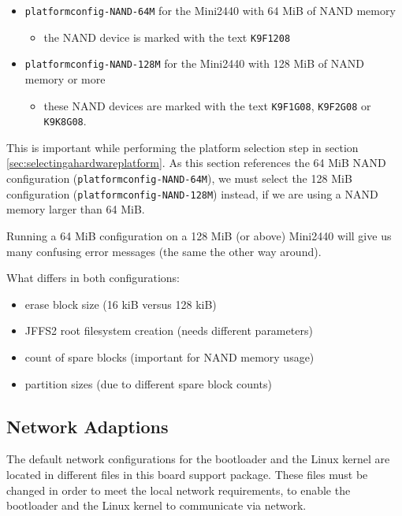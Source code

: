 \begin{itemize}
 \item \texttt{platformconfig-NAND-64M} for the Mini2440 with 64 MiB of NAND
   memory
  \begin{itemize}
   \item the NAND device is marked with the text \texttt{K9F1208}
  \end{itemize}
 \item \texttt{platformconfig-NAND-128M} for the Mini2440 with
  128 MiB of NAND memory or more
  \begin{itemize}
    \item these NAND devices are marked with the text \texttt{K9F1G08},
   \texttt{K9F2G08} or \texttt{K9K8G08}.
  \end{itemize}
\end{itemize}

This is important while performing the platform selection step in section
\ref{sec:selectingahardwareplatform}.
As this section references the 64 MiB NAND configuration
(\texttt{platformconfig-NAND-64M}), we must select the 128 MiB configuration
(\texttt{platformconfig-NAND-128M}) instead, if we are using a NAND memory
larger than 64 MiB.

\begin{important}
Running a 64 MiB configuration on a 128 MiB (or above) Mini2440 will
give us many confusing error messages (the same the other way around).
\end{important}

What differs in both configurations:
\begin{itemize}
 \item erase block size (16 kiB versus 128 kiB)
 \item JFFS2 root filesystem creation (needs different parameters)
 \item count of spare blocks (important for NAND memory usage)
 \item partition sizes (due to different spare block counts)
\end{itemize}

\subsection{Network Adaptions}		\label{sec:networkadaptions}

The default network configurations for the bootloader and the Linux kernel are
located in different files in this board support package. These files must be
changed in order to meet the local network requirements, to enable the
bootloader and the Linux kernel to communicate via network.

